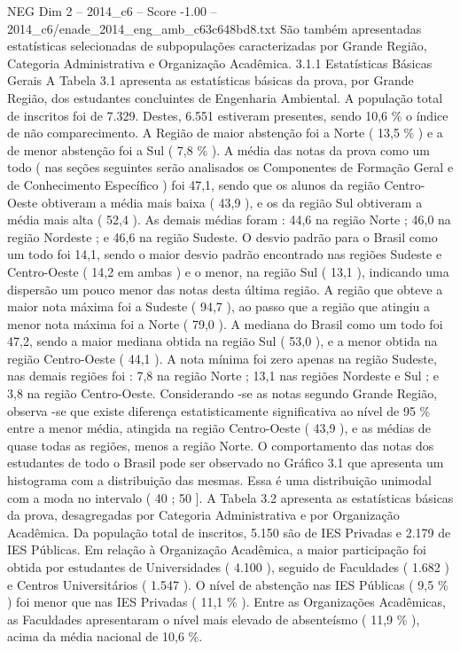 \begin{textsample}{NEG Dim 2 – 2014\_c6 – Score -1.00 – 2014\_c6/enade\_2014\_eng\_amb\_c63c648bd8.txt}
São também apresentadas estatísticas selecionadas de subpopulações caracterizadas por Grande Região, Categoria Administrativa e Organização Acadêmica. 3.1.1 Estatísticas Básicas Gerais A Tabela 3.1 apresenta as estatísticas básicas da prova, por Grande Região, dos estudantes concluintes de Engenharia Ambiental.
A população total de inscritos foi de 7.329.
Destes, 6.551 estiveram presentes, sendo 10,6 \% o índice de não comparecimento.
A Região de maior abstenção foi a Norte ( 13,5 \% ) e a de menor abstenção foi a Sul ( 7,8 \% ).
A média das notas da prova como um todo ( nas seções seguintes serão analisados os Componentes de Formação Geral e de Conhecimento Específico ) foi 47,1, sendo que os alunos da região Centro-Oeste obtiveram a média mais baixa ( 43,9 ), e os da região Sul obtiveram a média mais alta ( 52,4 ).
As demais médias foram : 44,6 na região Norte ; 46,0 na região Nordeste ; e 46,6 na região Sudeste.
O desvio padrão para o Brasil como um todo foi 14,1, sendo o maior desvio padrão encontrado nas regiões Sudeste e Centro-Oeste ( 14,2 em ambas ) e o menor, na região Sul ( 13,1 ), indicando uma dispersão um pouco menor das notas desta última região.
A região que obteve a maior nota máxima foi a Sudeste ( 94,7 ), ao passo que a região que atingiu a menor nota máxima foi a Norte ( 79,0 ).
A mediana do Brasil como um todo foi 47,2, sendo a maior mediana obtida na região Sul ( 53,0 ), e a menor obtida na região Centro-Oeste ( 44,1 ).
A nota mínima foi zero apenas na região Sudeste, nas demais regiões foi : 7,8 na região Norte ; 13,1 nas regiões Nordeste e Sul ; e 3,8 na região Centro-Oeste.
Considerando -se as notas segundo Grande Região, observa -se que existe diferença estatisticamente significativa ao nível de 95 \% entre a menor média, atingida na região Centro-Oeste ( 43,9 ), e as médias de quase todas as regiões, menos a região Norte.
O comportamento das notas dos estudantes de todo o Brasil pode ser observado no Gráfico 3.1 que apresenta um histograma com a distribuição das mesmas.
Essa é uma distribuição unimodal com a moda no intervalo ( 40 ; 50 ].
A Tabela 3.2 apresenta as estatísticas básicas da prova, desagregadas por Categoria Administrativa e por Organização Acadêmica.
Da população total de inscritos, 5.150 são de IES Privadas e 2.179 de IES Públicas.
Em relação à Organização Acadêmica, a maior participação foi obtida por estudantes de Universidades ( 4.100 ), seguido de Faculdades ( 1.682 ) e Centros Universitários ( 1.547 ).
O nível de abstenção nas IES Públicas ( 9,5 \% ) foi menor que nas IES Privadas ( 11,1 \% ).
Entre as Organizações Acadêmicas, as Faculdades apresentaram o nível mais elevado de absenteísmo ( 11,9 \% ), acima da média nacional de 10,6 \%.

\end{textsample}
